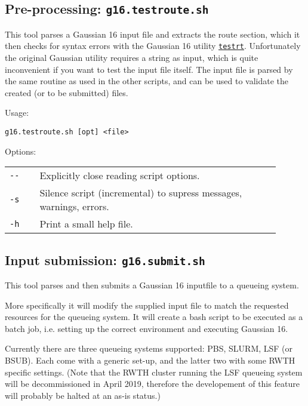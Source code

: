 \documentclass[   %
  final,          %
  a4paper         %
]{article}
\begin{document}
\subsection{Pre-processing: \texorpdfstring{{\lstinline`g16.testroute.sh`}}{g16.testroute.sh}}
\label{sec:g16.testroute}

This tool parses a Gaussian 16 input file and extracts the route section, 
which it then checks for syntax errors with the Gaussian 16 utility 
\href{http://gaussian.com/testrt/}{\texttt{testrt}}.
Unfortunately the original Gaussian utility requires a string as input, 
which is quite inconvenient if you want to test the input file itself.
The input file is parsed by the same routine as used in the other scripts,
and can be used to validate the created (or to be submitted) files.

Usage: 

\lstinline`g16.testroute.sh [opt] <file>`

Options:

\begin{tabular}{p{0.1\linewidth}p{0.8\linewidth}}
  {\lstinline`--`}       & Explicitly close reading script options. \\
  {\lstinline`-s`}       & Silence script (incremental) to supress messages, warnings, errors. \\
  {\lstinline`-h`}       & Print a small help file. \\
\end{tabular}

\subsection{Input submission: \texorpdfstring{{\lstinline`g16.submit.sh`}}{g16.submit.sh}}
\label{sec:g16.submit}

This tool parses and then submits a Gaussian 16 inputfile to a queueing system.

More specifically it will modify the supplied input file 
to match the requested resources for the queueing system.
It will create a bash script to be executed as a batch job, 
i.e. setting up the correct environment and executing Gaussian 16.

Currently there are three queueing systems supported: PBS, SLURM, LSF (or BSUB).
Each come with a generic set-up, and the latter two with some RWTH specific settings.
(Note that the RWTH cluster running the LSF queueing system will be decommissioned in April 2019,
therefore the developement of this feature will probably be halted at an as-is status.)
\end{document}
